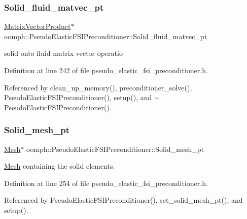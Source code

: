\subsubsection{\texorpdfstring{Solid\+\_\+fluid\+\_\+matvec\+\_\+pt}{Solid\_fluid\_matvec\_pt}}
{\footnotesize\ttfamily \hyperlink{classoomph_1_1MatrixVectorProduct}{Matrix\+Vector\+Product}$\ast$ oomph\+::\+Pseudo\+Elastic\+F\+S\+I\+Preconditioner\+::\+Solid\+\_\+fluid\+\_\+matvec\+\_\+pt\hspace{0.3cm}{\ttfamily [private]}}



solid onto fluid matrix vector operatio 



Definition at line 242 of file pseudo\+\_\+elastic\+\_\+fsi\+\_\+preconditioner.\+h.



Referenced by clean\+\_\+up\+\_\+memory(), preconditioner\+\_\+solve(), Pseudo\+Elastic\+F\+S\+I\+Preconditioner(), setup(), and $\sim$\+Pseudo\+Elastic\+F\+S\+I\+Preconditioner().

\mbox{\label{classoomph_1_1PseudoElasticFSIPreconditioner_afd02372d56906a9f86c5b00bf50297aa}} 
\subsubsection{\texorpdfstring{Solid\+\_\+mesh\+\_\+pt}{Solid\_mesh\_pt}}
{\footnotesize\ttfamily \hyperlink{classoomph_1_1Mesh}{Mesh}$\ast$ oomph\+::\+Pseudo\+Elastic\+F\+S\+I\+Preconditioner\+::\+Solid\+\_\+mesh\+\_\+pt\hspace{0.3cm}{\ttfamily [private]}}



\hyperlink{classoomph_1_1Mesh}{Mesh} containing the solid elements. 



Definition at line 254 of file pseudo\+\_\+elastic\+\_\+fsi\+\_\+preconditioner.\+h.



Referenced by Pseudo\+Elastic\+F\+S\+I\+Preconditioner(), set\+\_\+solid\+\_\+mesh\+\_\+pt(), and setup().

